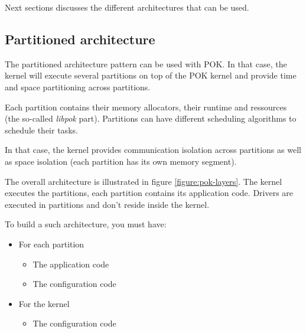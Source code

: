    Next sections discusses the different architectures that can be used.

      \subsection{Partitioned architecture}
      The partitioned architecture pattern can be used with POK. In that case,
      the kernel will execute several partitions on top of the POK kernel and
      provide time and space partitioning across partitions. 


      Each partition contains their memory allocators, their runtime and
      ressources (the so-called \textit{libpok} part). Partitions can have
      different scheduling algorithms to schedule their tasks.

      In that case, the kernel provides communication isolation across
      partitions as well as space isolation (each partition has its own memory
      segment).

      The overall architecture is illustrated in figure \ref{figure:pok-layers}.
      The kernel executes the partitions, each partition contains its
      application code. Drivers are executed in partitions and don't reside
      inside the kernel.



      To build a such architecture, you must have:
      \begin{itemize}
         \item
            For each partition
            \begin{itemize}
               \item
                  The application code
               \item
                  The configuration code
            \end{itemize}
         \item
            For the kernel
            \begin{itemize}
               \item
                  The configuration code
            \end{itemize}
      \end{itemize}




